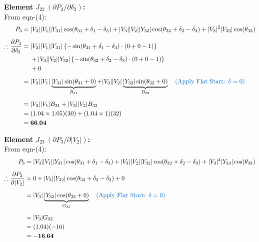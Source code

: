 \documentclass[11pt]{article}
\begin{document}
\begin{stepbox}
\vspace{0.3cm}
\noindent \textbf{Element $J_{22} \ (\partial P_3 / \partial \delta_3)$:} \\
From eqn-(4):
\begin{align*}
    P_3 =\;& |V_3||V_1||Y_{31}| \cos(\theta_{31} + \delta_1 - \delta_3) + |V_3||V_2||Y_{32}| \cos(\theta_{32} + \delta_2 - \delta_3) + |V_3|^2|Y_{33}| \cos(\theta_{33}) \\[0.2cm]
    \therefore \frac{\partial P_3}{\partial \delta_3} =\;& |V_3||V_1||Y_{31}| \left\{-\sin(\theta_{31} + \delta_1 - \delta_3) \cdot (0 + 0 - 1)\right\} \\
    & + |V_3||V_2||Y_{32}| \left\{-\sin(\theta_{32} + \delta_2 - \delta_3) \cdot (0 + 0 - 1)\right\} \\
    & + 0 \\[0.2cm]
    =\;& |V_3||V_1|\underbrace{|Y_{31}|\sin(\theta_{31} + 0)}_{B_{31}} + |V_3||V_2|\underbrace{|Y_{32}|\sin(\theta_{32} + 0)}_{B_{32}} \quad \text{\textcolor{mainblue}{(Apply Flat Start: $\delta=0$)}} \\[0.2cm]
    =\;& |V_3||V_1|B_{31} + |V_3||V_2|B_{32} \\
    =\;& (1.04 \times 1.05)(30) + (1.04 \times 1)(32) \\
    =\;& \mathbf{66.04}
\end{align*}

\newpage
\vspace{0.3cm}
\noindent \textbf{Element $J_{23} \ (\partial P_3 / \partial |V_2|)$:} \\
From eqn-(4):
\begin{align*}
    P_3 =\;& |V_3||V_1||Y_{31}| \cos(\theta_{31} + \delta_1 - \delta_3) + |V_3||V_2||Y_{32}| \cos(\theta_{32} + \delta_2 - \delta_3) + |V_3|^2|Y_{33}| \cos(\theta_{33}) \\[0.2cm]
    \therefore \frac{\partial P_3}{\partial |V_2|} =\;& 0 + |V_3||Y_{32}| \cos(\theta_{32} + \delta_2 - \delta_3) + 0 \\[0.2cm]
    =\;& |V_3|\underbrace{|Y_{32}|\cos(\theta_{32} + 0)}_{G_{32}} \quad \text{\textcolor{mainblue}{(Apply Flat Start: $\delta=0$)}} \\[0.2cm]
    =\;& |V_3|G_{32} \\
    =\;& (1.04)(-16) \\
    =\;& \mathbf{-16.64}
\end{align*}


\end{stepbox}
\end{document}
